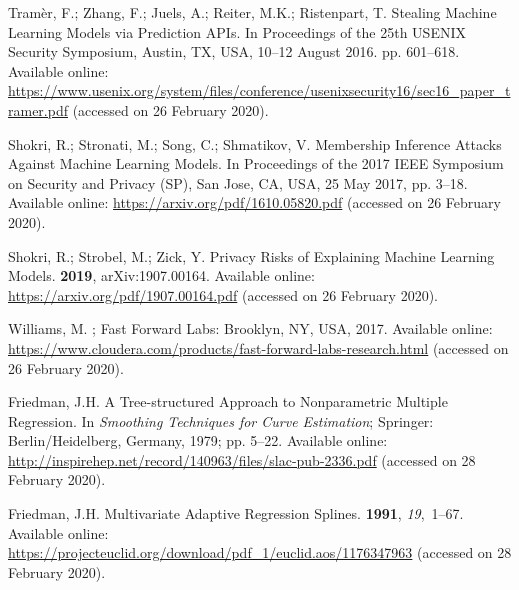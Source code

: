 \documentclass[information,article,accept,moreauthors,pdftex]{Definitions/mdpi}
\begin{document}
\begin{thebibliography}{999}
Tram{\`e}r, F.; Zhang, F.; Juels, A.; Reiter, M.K.; Ristenpart, T.
\newblock Stealing {M}achine {L}earning {M}odels via {P}rediction {A}{P}{I}s.
\newblock In Proceedings of the 25th USENIX Security Symposium, Austin, TX, USA, 10--12 August 2016. pp. 601--618.
\newblock Available online: 
\url{https://www.usenix.org/system/files/conference/usenixsecurity16/sec16_paper_tramer.pdf} (accessed on 26 February 2020).

Shokri, R.; Stronati, M.; Song, C.; Shmatikov, V.
\newblock Membership {I}nference {A}ttacks {A}gainst {M}achine {L}earning
  {M}odels.
\newblock  In Proceedings of the 2017 IEEE Symposium on Security and Privacy (SP), San Jose, CA, USA, 25 May 2017, pp.
  3--18.
\newblock Available online: \url{https://arxiv.org/pdf/1610.05820.pdf} (accessed on 26 February 2020).

Shokri, R.; Strobel, M.; Zick, Y.
\newblock Privacy {R}isks of {E}xplaining {M}achine {L}earning {M}odels.
 {\bf 2019}, arXiv:1907.00164.
\newblock Available online: \url{https://arxiv.org/pdf/1907.00164.pdf} (accessed on 26 February 2020).

Williams, M.
; {Fast Forward Labs}: Brooklyn, NY, USA, 2017.   %
\newblock Available online: 
  \url{https://www.cloudera.com/products/fast-forward-labs-research.html} (accessed on 26 February 2020).

Friedman, J.H.
\newblock A {T}ree-structured {A}pproach to {N}onparametric {M}ultiple
  {R}egression. In {\em Smoothing Techniques for Curve Estimation}; Springer: {Berlin/Heidelberg, Germany,} 
  1979; pp. 5--22.
\newblock Available online: 
\url{http://inspirehep.net/record/140963/files/slac-pub-2336.pdf} (accessed on 28 February 2020).

Friedman, J.H.
\newblock Multivariate {A}daptive {R}egression {S}plines.
 {\bf 1991}, {\em 19},~1--67.
\newblock Available online: 
\url{https://projecteuclid.org/download/pdf_1/euclid.aos/1176347963} (accessed on 28 February 2020).


\end{thebibliography}
\end{document}
